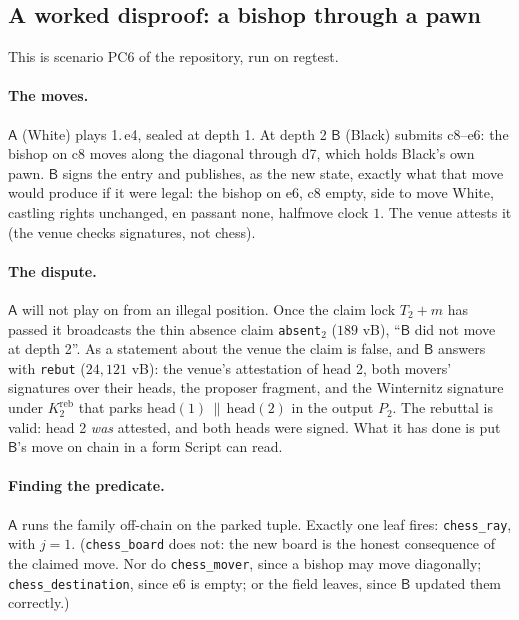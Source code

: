 \documentclass[11pt]{article}
\newcommand{\Pa}{\mathsf{A}}
\newcommand{\Pb}{\mathsf{B}}
\begin{document}
\subsection{A worked disproof: a bishop through a pawn}

This is scenario PC6 of the repository, run on regtest.

\paragraph{The moves.} $\Pa$ (White) plays 1.\,e4, sealed at depth 1.
At depth 2 $\Pb$ (Black) submits c8--e6: the bishop on c8 moves along
the diagonal through d7, which holds Black's own pawn. $\Pb$ signs the
entry and publishes, as the new state, exactly what that move would
produce if it were legal: the bishop on e6, c8 empty, side to move
White, castling rights unchanged, en passant none, halfmove clock $1$.
The venue attests it (the venue checks signatures, not chess).

\paragraph{The dispute.} $\Pa$ will not play on from an illegal
position. Once the claim lock $T_2 + m$ has passed it broadcasts the
thin absence claim \texttt{absent}$_2$ ($189$ vB), ``$\Pb$ did not move
at depth 2''. As a statement about the venue the claim is false, and
$\Pb$ answers with \texttt{rebut} ($24{,}121$ vB): the venue's attestation
of head 2, both movers' signatures over their heads, the proposer
fragment, and the Winternitz signature under $K^{\mathrm{reb}}_2$ that parks
$\mathrm{head}(1)\,\|\,\mathrm{head}(2)$ in the output $P_2$. The
rebuttal is valid: head 2 \emph{was} attested, and both heads were signed. What it has done
is put $\Pb$'s move on chain in a form Script can read.

\paragraph{Finding the predicate.} $\Pa$ runs the family off-chain on
the parked tuple. Exactly one leaf fires: \texttt{chess\_ray}, with
$j = 1$. (\texttt{chess\_board} does not: the new board is the honest
consequence of the claimed move. Nor do \texttt{chess\_mover}, since
a bishop may move diagonally; \texttt{chess\_destination}, since e6 is
empty; or the field leaves, since $\Pb$ updated them correctly.)
\end{document}
